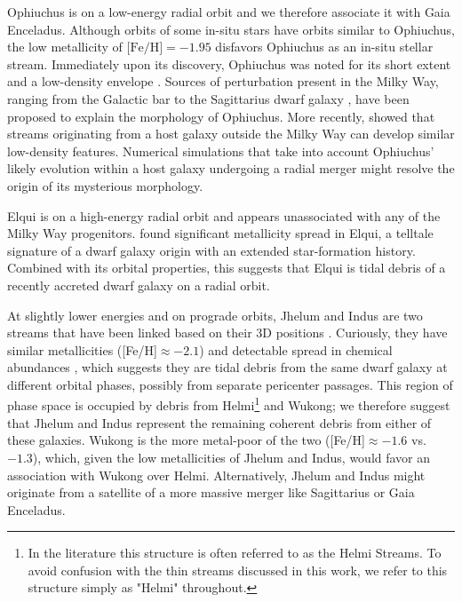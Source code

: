 \documentclass[twocolumn]{aastex63}
\newcommand{\feh}{\ensuremath{\textrm{[Fe/H]}}}
\begin{document}
Ophiuchus is on a low-energy radial orbit and we therefore associate it with Gaia Enceladus.
Although orbits of some in-situ stars have orbits similar to Ophiuchus, the low metallicity of $\feh=-1.95$ \citep{sesar2015} disfavors Ophiuchus as an in-situ stellar stream.
Immediately upon its discovery, Ophiuchus was noted for its short extent and a low-density envelope \citep{bernard2015, sesar2015}.
Sources of perturbation present in the Milky Way, ranging from the Galactic bar \citep{price-whelan2016} to the Sagittarius dwarf galaxy \citep{lane2020}, have been proposed to explain the morphology of Ophiuchus.
More recently, \citet{carlberg2019} showed that streams originating from a host galaxy outside the Milky Way can develop similar low-density features.
Numerical simulations that take into account Ophiuchus' likely evolution within a host galaxy undergoing a radial merger might resolve the origin of its mysterious morphology.

Elqui is on a high-energy radial orbit and appears unassociated with any of the Milky Way progenitors.
\citet{ji2020} found significant metallicity spread in Elqui, a telltale signature of a dwarf galaxy origin with an extended star-formation history.
Combined with its orbital properties, this suggests that Elqui is tidal debris of a recently accreted dwarf galaxy on a radial orbit.


At slightly lower energies and on prograde orbits, Jhelum and Indus are two streams that have been linked based on their 3D positions \citep{bonaca2019b}.
Curiously, they have similar metallicities ([Fe/H]$\approx-2.1$) and detectable spread in chemical abundances \citep{ji2020}, which suggests they are tidal debris from the same dwarf galaxy at different orbital phases, possibly from separate pericenter passages.
This region of phase space is occupied by debris from Helmi\footnote{In the literature this structure is often referred to as the Helmi Streams.  To avoid confusion with the thin streams discussed in this work, we refer to this structure simply as "Helmi" throughout.} and Wukong; we therefore suggest that Jhelum and Indus represent the remaining coherent debris from either of these galaxies.
Wukong is the more metal-poor of the two ([Fe/H]$\approx-1.6$ vs. $-1.3$), which, given the low metallicities of Jhelum and Indus, would favor an association with Wukong over Helmi.
Alternatively, Jhelum and Indus might originate from a satellite of a more massive merger like Sagittarius or Gaia Enceladus.
\end{document}
